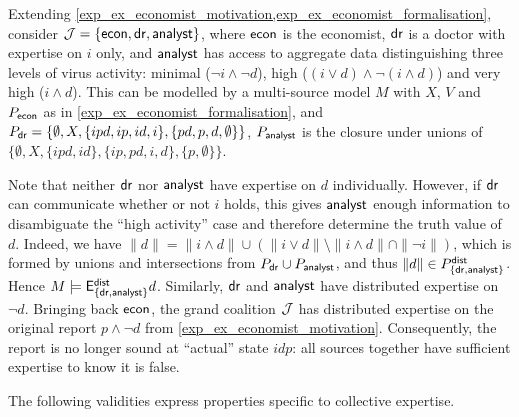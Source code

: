 \begin{example}
\label{exp_ex_mutlisource}

    Extending \cref{exp_ex_economist_motivation,exp_ex_economist_formalisation},
    consider $\mathcal{J} = \{\mathsf{econ}, \mathsf{dr}, \mathsf{analyst}\}$, where $\mathsf{econ}$ is the economist,
    $\mathsf{dr}$ is a doctor with expertise on $i$ only, and $\mathsf{analyst}$ has access to
    aggregate data distinguishing three levels of virus activity: minimal
    ($\neg i \land \neg d$), high ($(i \lor d) \land \neg(i \land d)$) and very
    high ($i \land d$). This can be modelled by a multi-source model $M$ with
    $X$, $V$ and $P_{\mathsf{econ}}$ as in \cref{exp_ex_economist_formalisation}, and $P_{\mathsf{dr}}
    = \{\emptyset, X, \{ipd, ip, id, i\}, \{pd, p, d, \emptyset\}\}$,
    $P_{\mathsf{analyst}}$ is the closure under unions of $\{\emptyset, X, \{ipd, id\},
    \{ip, pd, i, d\}, \{p, \emptyset\}\}$.

    Note that neither $\mathsf{dr}$ nor $\mathsf{analyst}$ have expertise on $d$ individually.
    However, if $\mathsf{dr}$ can communicate whether or not $i$ holds, this gives
    $\mathsf{analyst}$ enough information to disambiguate the ``high activity'' case
    and therefore determine the truth value of $d$. Indeed, we have $\|d\| = \|i \land d\| \cup
    (\|i \lor d\| \setminus \|i \land d\| \cap \|\neg i\|)$, which is formed by
    unions and intersections from $P_{\mathsf{dr}} \cup P_{\mathsf{analyst}}$, and thus $\|d\| \in
    P^{\mathsf{dist}}_{\{\mathsf{dr}, \mathsf{analyst}\}}$. Hence $M \models \mathsf{E}_{\{\mathsf{dr}, \mathsf{analyst}\}}^{\mathsf{dist}}
    d$.
    Similarly, $\mathsf{dr}$ and $\mathsf{analyst}$ have distributed expertise on $\neg d$.
    Bringing back $\mathsf{econ}$, the grand coalition $\mathcal{J}$ has distributed expertise
    on the original report $p \land \neg d$ from
    \cref{exp_ex_economist_motivation}. Consequently, the report is no longer sound
    at ``actual'' state $idp$: all sources together have sufficient expertise to
    know it is false.

\end{example}

The following validities express properties
specific to collective expertise.

